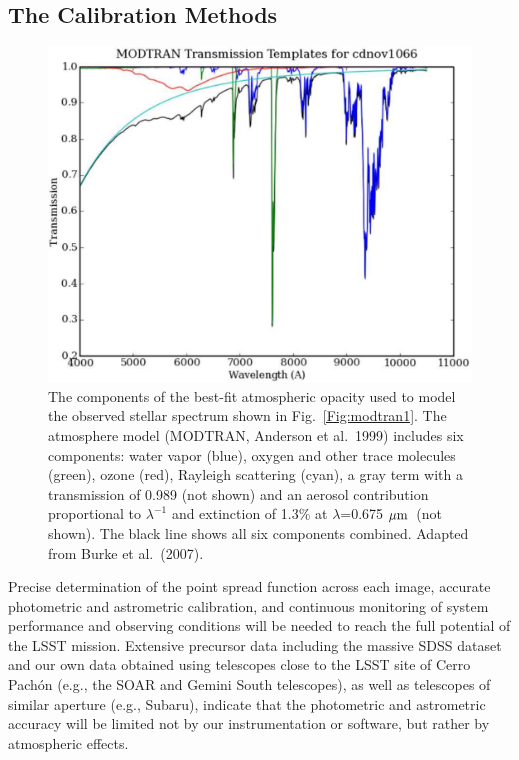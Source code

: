 \documentclass{emulateapj}
\def\mic              {\hbox{$\mu{\rm m}$}}
\begin{document}
\newpage
\subsection{ The Calibration Methods }



\begin{figure}
\includegraphics[width=1.0\hsize,clip]{modtran2.pdf}
\caption{The components of the best-fit atmospheric opacity used to
model the observed stellar spectrum shown in Fig.~\ref{Fig:modtran1}.
The atmosphere model (MODTRAN, Anderson et al.~1999) includes six
components: water vapor (blue), oxygen and other trace molecules
(green), ozone (red), Rayleigh scattering (cyan), a gray term
with a transmission of 0.989 (not shown) and an aerosol contribution
proportional to $\lambda^{-1}$ and extinction of 1.3\% at $\lambda$=0.675 \mic\
(not shown). The black line shows all six components combined.
Adapted from Burke et al.~(2007).}
\label{Fig:modtran2}
\end{figure}


Precise determination of the point spread function across each image, 
accurate photometric and astrometric calibration, and continuous monitoring 
of system performance and observing conditions will be needed to reach the 
full potential of the LSST mission. Extensive precursor data including the 
massive SDSS dataset and our own data obtained using telescopes close to 
the LSST site of Cerro Pach\'{o}n (e.g., the SOAR and Gemini South telescopes), 
as well as telescopes of similar aperture (e.g., Subaru), indicate that the 
photometric and astrometric accuracy will be limited not by our instrumentation 
or software, but rather by atmospheric effects. 
\end{document}
